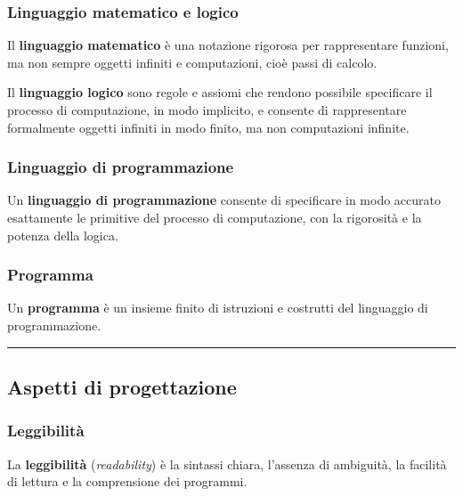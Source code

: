 \documentclass[a4paper]{article}
\newcommand{\longline}{\noindent\rule{\textwidth}{0.4pt}}
\begin{document}
	\subsubsection{Linguaggio matematico e logico}
	
	Il \textcolor{Red3}{\textbf{linguaggio matematico}} è una notazione rigorosa per rappresentare funzioni, ma non sempre oggetti infiniti e computazioni, cioè passi di calcolo.\newline
	
	\noindent
	Il \textcolor{Red3}{\textbf{linguaggio logico}} sono regole e assiomi che rendono possibile specificare il processo di computazione, in modo implicito, e consente di rappresentare formalmente oggetti infiniti in modo finito, ma non computazioni infinite.
	
	\subsubsection{Linguaggio di programmazione}
	
	Un \textcolor{Red3}{\textbf{linguaggio di programmazione}} consente di specificare in modo accurato esattamente le primitive del processo di computazione, con la rigorosità e la potenza della logica.\newpage
	
	\subsubsection{Programma}
	
	Un \textcolor{Red3}{\textbf{programma}} è un insieme finito di istruzioni e costrutti del linguaggio di programmazione.

	\longline
		
	\subsection{Aspetti di progettazione}
	
	\subsubsection{Leggibilità}
	
	La \textcolor{Red3}{\textbf{leggibilità}} (\emph{readability}) è la sintassi chiara, l'assenza di ambiguità, la facilità di lettura e la comprensione dei programmi.\newline
	
\end{document}
